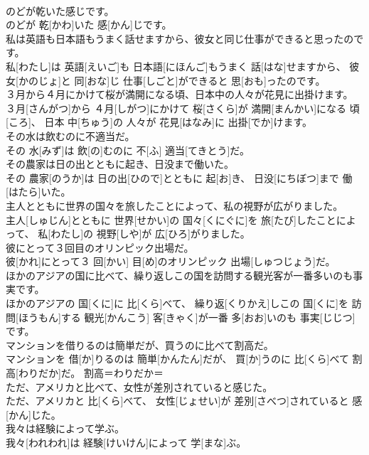 \documentclass[8pt]{extreport}
\begin{document}
\begin{CJK}{UTF8}{min}
\\	のどが乾いた感じです。	
\\	のどが 乾[かわ]いた 感[かん]じです。	
\\	私は英語も日本語もうまく話せますから、彼女と同じ仕事ができると思ったのです。	
\\	私[わたし]は 英語[えいご]も 日本語[にほんご]もうまく 話[はな]せますから、 彼女[かのじょ]と 同[おな]じ 仕事[しごと]ができると 思[おも]ったのです。	
\\	３月から４月にかけて桜が満開になる頃、日本中の人々が花見に出掛けます。	
\\	３月[さんがつ]から ４月[しがつ]にかけて 桜[さくら]が 満開[まんかい]になる 頃[ころ]、 日本 中[ちゅう]の 人々が 花見[はなみ]に 出掛[でか]けます。	
\\	その水は飲むのに不適当だ。	
\\	その 水[みず]は 飲[の]むのに 不[ふ] 適当[てきとう]だ。	
\\	その農家は日の出とともに起き、日没まで働いた。	
\\	その 農家[のうか]は 日の出[ひので]とともに 起[お]き、 日没[にちぼつ]まで 働[はたら]いた。	
\\	主人とともに世界の国々を旅したことによって、私の視野が広がりました。	
\\	主人[しゅじん]とともに 世界[せかい]の 国々[くにぐに]を 旅[たび]したことによって、 私[わたし]の 視野[しや]が 広[ひろ]がりました。	
\\	彼にとって３回目のオリンピック出場だ。	
\\	彼[かれ]にとって３ 回[かい] 目[め]のオリンピック 出場[しゅつじょう]だ。	
\\	ほかのアジアの国に比べて、繰り返しこの国を訪問する観光客が一番多いのも事実です。	
\\	ほかのアジアの 国[くに]に 比[くら]べて、 繰り返[くりかえ]しこの 国[くに]を 訪問[ほうもん]する 観光[かんこう] 客[きゃく]が一番 多[おお]いのも 事実[じじつ]です。	
\\	マンションを借りるのは簡単だが、買うのに比べて割高だ。	
\\	マンションを 借[か]りるのは 簡単[かんたん]だが、 買[か]うのに 比[くら]べて 割高[わりだか]だ。	割高＝わりだか＝ 
\\	ただ、アメリカと比べて、女性が差別されていると感じた。	
\\	ただ、アメリカと 比[くら]べて、 女性[じょせい]が 差別[さべつ]されていると 感[かん]じた。	
\\	我々は経験によって学ぶ。	
\\	我々[われわれ]は 経験[けいけん]によって 学[まな]ぶ。	

\end{CJK}
\end{document}
